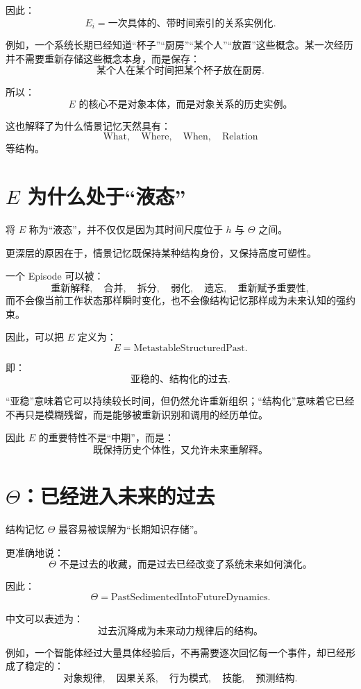 因此：
\[
\boxed{
E_i=
\text{一次具体的、带时间索引的关系实例化}.
}
\]

例如，一个系统长期已经知道“杯子”“厨房”“某个人”“放置”这些概念。某一次经历并不需要重新存储这些概念本身，而是保存：
\[
\text{某个人在某个时间把某个杯子放在厨房}.
\]

所以：
\[
\boxed{
E
\text{ 的核心不是对象本体，而是对象关系的历史实例。}
}
\]

这也解释了为什么情景记忆天然具有：
\[
\text{What},
\quad
\text{Where},
\quad
\text{When},
\quad
\text{Relation}
\]
等结构。

\section{$E$ 为什么处于“液态”}

将 $E$ 称为“液态”，并不仅仅是因为其时间尺度位于 $h$ 与 $\Theta$ 之间。

更深层的原因在于，情景记忆既保持某种结构身份，又保持高度可塑性。

一个 Episode 可以被：
\[
\text{重新解释},
\quad
\text{合并},
\quad
\text{拆分},
\quad
\text{弱化},
\quad
\text{遗忘},
\quad
\text{重新赋予重要性},
\]
而不会像当前工作状态那样瞬时变化，也不会像结构记忆那样成为未来认知的强约束。

因此，可以把 $E$ 定义为：
\[
\boxed{
E=
\text{MetastableStructuredPast}.
}
\]

即：
\[
\boxed{
\text{亚稳的、结构化的过去}.
}
\]

“亚稳”意味着它可以持续较长时间，但仍然允许重新组织；“结构化”意味着它已经不再只是模糊残留，而是能够被重新识别和调用的经历单位。

因此 $E$ 的重要特性不是“中期”，而是：
\[
\boxed{
\text{既保持历史个体性，又允许未来重解释。}
}
\]

\section{$\Theta$：已经进入未来的过去}

结构记忆 $\Theta$ 最容易被误解为“长期知识存储”。

更准确地说：
\[
\boxed{
\Theta
\text{ 不是过去的收藏，而是过去已经改变了系统未来如何演化。}
}
\]

因此：
\[
\boxed{
\Theta=
\text{PastSedimentedIntoFutureDynamics}.
}
\]

中文可以表述为：
\[
\boxed{
\text{过去沉降成为未来动力规律后的结构。}
}
\]

例如，一个智能体经过大量具体经验后，不再需要逐次回忆每一个事件，却已经形成了稳定的：
\[
\text{对象规律},
\quad
\text{因果关系},
\quad
\text{行为模式},
\quad
\text{技能},
\quad
\text{预测结构}.
\]

